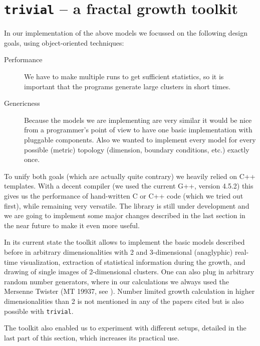 \documentclass[twocolumn, 10pt]{scrartcl}
\begin{document}
    \section{\lstinline!trivial! -- a fractal growth toolkit}
        In our implementation of the above models we focussed on the following design goals, using object-oriented
        techniques:
        \begin{description}
            \item[Performance] We have to make multiple runs to get sufficient statistics, so it is important that the
                programs generate large clusters in short times.
            \item[Genericness] Because the models we are implementing are very similar it would be nice from a
                programmer's point of view to have one basic implementation with pluggable components. Also we wanted to
                implement every model for every possible (metric) topology (dimension, boundary conditions, etc.)
                exactly once.
        \end{description}
        To unify both goals (which are actually quite contrary) we heavily relied on C++ templates. With a decent
        compiler (we used the current G++, version 4.5.2) this gives us the performance of hand-written C or C++ code
        (which we tried out first), while remaining very versatile. The library is still under development and we are
        going to implement some major changes described in the last section in the near future to make it even more
        useful.

        In its current state the toolkit allows to implement the basic models described before in arbitrary
        dimensionalities with 2 and 3-dimensional (anaglyphic) real-time visualization, extraction of statistical
        information during the growth, and drawing of single images of 2-dimensional clusters. One can also plug in
        arbitrary random number generators, where in our calculations we always used the Mersenne Twister (MT 19937, see
        \cite{src-matsumoto}).  Number limited growth calculation in higher dimensionalities than 2 is not mentioned in
        any of the papers cited but is also possible with \lstinline'trivial'.

        The toolkit also enabled us to experiment with different setups, detailed in the last part of this section,
        which increases its practical use.
\end{document}
